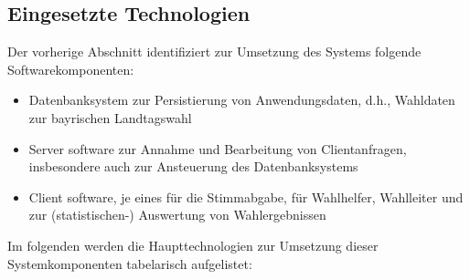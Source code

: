 \documentclass[a4paper,12pt]{article}
\begin{document}
\subsection{Eingesetzte Technologien}
Der vorherige Abschnitt identifiziert zur Umsetzung des Systems folgende Softwarekomponenten:
\begin{itemize}
      \item Datenbanksystem zur Persistierung von Anwendungsdaten, d.h., Wahldaten zur bayrischen Landtagswahl
      \item Server software zur Annahme und Bearbeitung von Clientanfragen, insbesondere auch zur Ansteuerung des Datenbanksystems
      \item Client software, je eines für die Stimmabgabe, für Wahlhelfer, Wahlleiter und zur (statistischen-) Auswertung von Wahlergebnissen 
\end{itemize}
Im folgenden werden die Haupttechnologien zur Umsetzung dieser Systemkomponenten tabelarisch aufgelistet:
\end{document}
